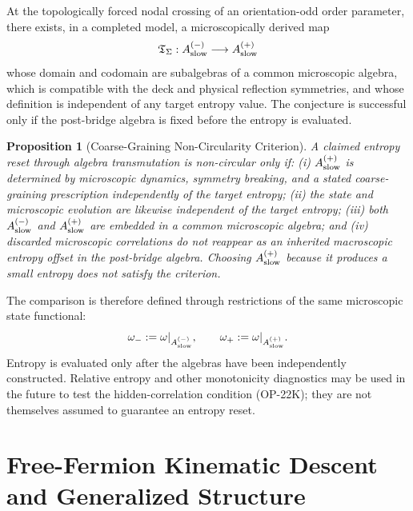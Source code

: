 \documentclass[11pt]{article}
\theoremstyle{canonmath}
\newtheorem{proposition}[theorem]{Proposition}
\theoremstyle{canonpostulate}
\theoremstyle{canonclaim}
\def\mathcal#1{#1}%
\begin{document}
\begin{conjecture} \label{conj:algebra_transmutation}
At the topologically forced nodal crossing of an orientation-odd order parameter, there exists, in a completed model, a microscopically derived map
\begin{equation}
\mathfrak T_{\Sigma}:\mathcal A_{\rm slow}^{(-)}\longrightarrow\mathcal A_{\rm slow}^{(+)}
\end{equation}
whose domain and codomain are subalgebras of a common microscopic algebra, which is compatible with the deck and physical reflection symmetries, and whose definition is independent of any target entropy value. The conjecture is successful only if the post-bridge algebra is fixed before the entropy is evaluated.
\end{conjecture}

\begin{proposition}[Coarse-Graining Non-Circularity Criterion] \label{prop:cg_noncircular}
A claimed entropy reset through algebra transmutation is non-circular only if: (i) $\mathcal A_{\rm slow}^{(+)}$ is determined by microscopic dynamics, symmetry breaking, and a stated coarse-graining prescription independently of the target entropy; (ii) the state and microscopic evolution are likewise independent of the target entropy; (iii) both $\mathcal A_{\rm slow}^{(-)}$ and $\mathcal A_{\rm slow}^{(+)}$ are embedded in a common microscopic algebra; and (iv) discarded microscopic correlations do not reappear as an inherited macroscopic entropy offset in the post-bridge algebra. Choosing $\mathcal A_{\rm slow}^{(+)}$ because it produces a small entropy does not satisfy the criterion.
\end{proposition}

The comparison is therefore defined through restrictions of the same microscopic state functional:
\begin{equation}
\omega_-:=\omega|_{\mathcal A_{\rm slow}^{(-)}},\qquad\omega_+:=\omega|_{\mathcal A_{\rm slow}^{(+)}}.
\end{equation}
Entropy is evaluated only after the algebras have been independently constructed. Relative entropy and other monotonicity diagnostics may be used in the future to test the hidden-correlation condition (OP-22K); they are not themselves assumed to guarantee an entropy reset.

\section{Free-Fermion Kinematic Descent and Generalized Structure}
\label{sec:fermion}
\end{document}
